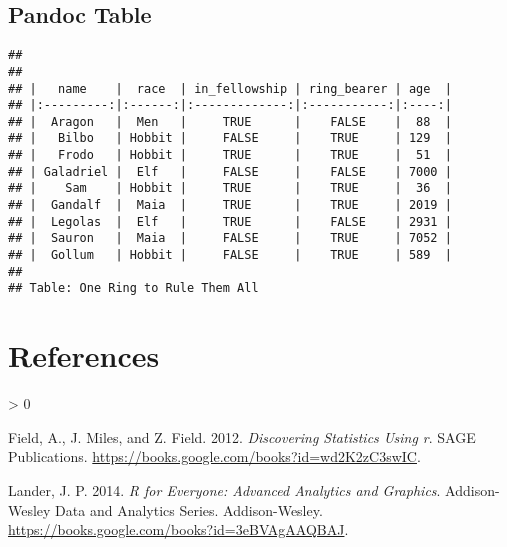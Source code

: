 \documentclass[
]{article}
\newlength{\cslhangindent}
\newenvironment{CSLReferences}[2] %
 {%
  \setlength{\parindent}{0pt}
  \ifodd #1 \everypar{\setlength{\hangindent}{\cslhangindent}}\ignorespaces\fi
  \ifnum #2 > 0
  \setlength{\parskip}{#2\baselineskip}
  \fi
 }%
 {}
\begin{document}
\hypertarget{pandoc-table}{%
\subsection{Pandoc Table}\label{pandoc-table}}

\begin{verbatim}
## 
## 
## |   name    |  race  | in_fellowship | ring_bearer | age  |
## |:---------:|:------:|:-------------:|:-----------:|:----:|
## |  Aragon   |  Men   |     TRUE      |    FALSE    |  88  |
## |   Bilbo   | Hobbit |     FALSE     |    TRUE     | 129  |
## |   Frodo   | Hobbit |     TRUE      |    TRUE     |  51  |
## | Galadriel |  Elf   |     FALSE     |    FALSE    | 7000 |
## |    Sam    | Hobbit |     TRUE      |    TRUE     |  36  |
## |  Gandalf  |  Maia  |     TRUE      |    TRUE     | 2019 |
## |  Legolas  |  Elf   |     TRUE      |    FALSE    | 2931 |
## |  Sauron   |  Maia  |     FALSE     |    TRUE     | 7052 |
## |  Gollum   | Hobbit |     FALSE     |    TRUE     | 589  |
## 
## Table: One Ring to Rule Them All
\end{verbatim}

\hypertarget{references}{%
\section*{References}\label{references}}

\hypertarget{refs}{}
\begin{CSLReferences}{1}{0}
\leavevmode\hypertarget{ref-field2012discovering}{}%
Field, A., J. Miles, and Z. Field. 2012. \emph{Discovering Statistics
Using r}. SAGE Publications.
\url{https://books.google.com/books?id=wd2K2zC3swIC}.

\leavevmode\hypertarget{ref-lander2014r}{}%
Lander, J. P. 2014. \emph{R for Everyone: Advanced Analytics and
Graphics}. Addison-Wesley Data and Analytics Series. Addison-Wesley.
\url{https://books.google.com/books?id=3eBVAgAAQBAJ}.

\end{CSLReferences}
\end{document}
